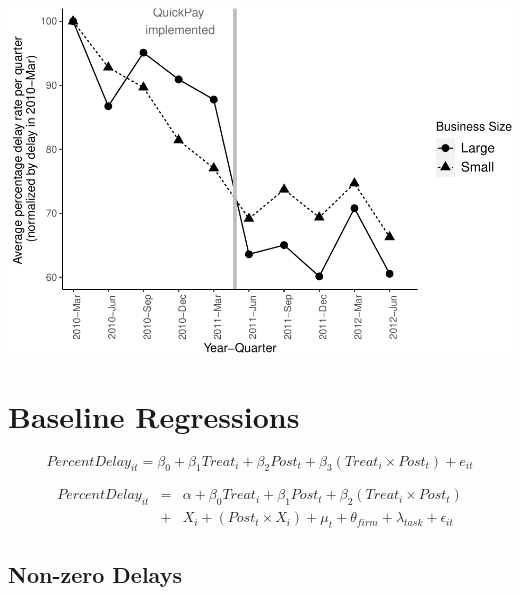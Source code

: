 \documentclass[
]{article}
\begin{document}
\includegraphics{qp_first_pc_delay_non_zero_files/figure-latex/normalized_plot-1.pdf}

\hypertarget{baseline-regressions}{%
\section{Baseline Regressions}\label{baseline-regressions}}

\[ PercentDelay_{it} = \beta_0 + \beta_1 Treat_i + \beta_2 Post_t + \beta_3 (Treat_i \times Post_t) + e_{it}\]

\[ \begin{aligned} PercentDelay_{it} &=& \alpha+\beta_0 Treat_i + \beta_1 Post_t + \beta_2 (Treat_i \times Post_t)\\
&+&  X_i + (Post_t \times X_i) + \mu_t + \theta_{firm} + \lambda_{task}+ \epsilon_{it}
\end{aligned}\]

\hypertarget{non-zero-delays}{%
\subsection{Non-zero Delays}\label{non-zero-delays}}
\end{document}
